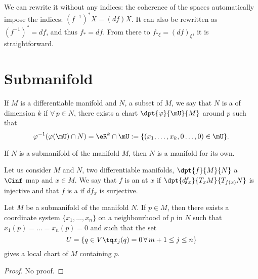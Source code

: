 We can rewrite it without  any indices: the coherence of the spaces automatically impose the indices: $(f^{-1})^*X=(df)X$. It can also be rewritten as $(f^{-1})^*=df$, and thus $f_*=df$. From there to $f_{* \xi}=(df)_{\xi}$, it is straightforward.

\section{Submanifold}

\begin{definition}      \label{DEFooLQHWooMOTgzq}
    If $M$ is a differentiable manifold and $N$, a subset of $M$, we say that $N$ is a  of dimension $k$ if $\forall\,p\in N$, there exists a chart $\dpt{\varphi}{\mU}{M}$ around $p$ such that
    \begin{equation}
       \varphi^{-1}(\varphi(\mU)\cap N)=\eR^k\cap\mU:=\{(x_1,\ldots,x_k,0\ldots,0)\in\mU\}.
    \end{equation}
\end{definition}

\begin{lemma}
    If \( N\) is a submanifold of the manifold \( M\), then \( N\) is a manifold for its own.
\end{lemma}

\begin{definition}
    Let us consider $M$ and $N$, two differentiable manifolds, $\dpt{f}{M}{N}$ a $\Cinf$ map and $x\in M$. We say that $f$ is an  at $x$ if $\dpt{df_x}{T_xM}{T_{f(x)}N}$ is injective and that $f$ is a  if $df_x$ is surjective.
\end{definition}

\begin{proposition}
Let $M$ be a submanifold of the manifold $N$. If $p\in M$, then there  exists a coordinate system $\{x_1,\ldots,x_n\}$ on a neighbourhood of $p$ in $N$ such that $x_1(p)=\ldots=x_n(p)=0$ and such that the set
\[
   U=\{q\in V\tq x_j(q)=0\,\forall\, m+1\leq j\leq n\}
\]
gives a local chart of $M$ containing $p$.
\label{prop:var_coord}
\end{proposition}

\begin{proof}
No proof.
\end{proof}

